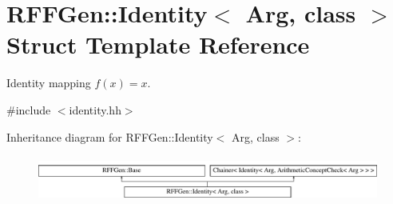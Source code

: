 \hypertarget{structRFFGen_1_1Identity}{\section{R\-F\-F\-Gen\-:\-:Identity$<$ Arg, class $>$ Struct Template Reference}
\label{structRFFGen_1_1Identity}
}


Identity mapping $ f(x)=x $.  




{\ttfamily \#include $<$identity.\-hh$>$}

Inheritance diagram for R\-F\-F\-Gen\-:\-:Identity$<$ Arg, class $>$\-:\begin{figure}[H]
\begin{center}
\leavevmode
\includegraphics[height=1.525886cm]{structRFFGen_1_1Identity}
\end{center}
\end{figure}
